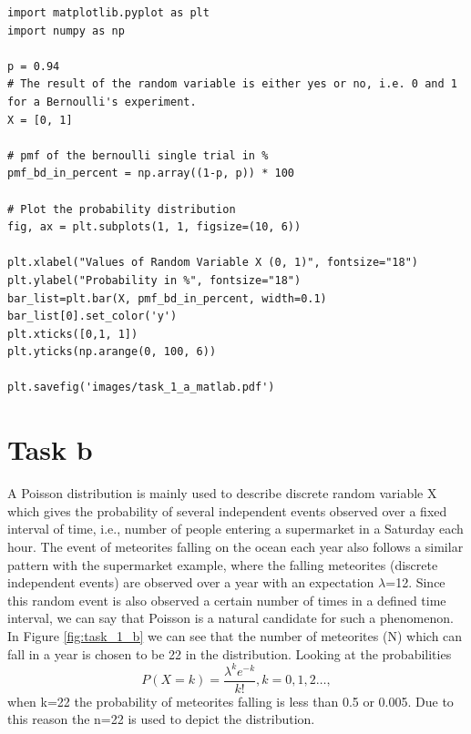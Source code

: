 \begin{lstlisting}[caption={: Plotting the PMF for representing Bernoulli’s single trial P (votes=for & votes = against)},label=code_task_1_a]
import matplotlib.pyplot as plt
import numpy as np

p = 0.94
# The result of the random variable is either yes or no, i.e. 0 and 1 for a Bernoulli's experiment.
X = [0, 1]

# pmf of the bernoulli single trial in %
pmf_bd_in_percent = np.array((1-p, p)) * 100

# Plot the probability distribution
fig, ax = plt.subplots(1, 1, figsize=(10, 6))

plt.xlabel("Values of Random Variable X (0, 1)", fontsize="18")
plt.ylabel("Probability in %", fontsize="18")
bar_list=plt.bar(X, pmf_bd_in_percent, width=0.1)
bar_list[0].set_color('y')
plt.xticks([0,1, 1])
plt.yticks(np.arange(0, 100, 6))

plt.savefig('images/task_1_a_matlab.pdf')
\end{lstlisting}

\section{Task b}

A Poisson distribution is mainly used to describe discrete random variable X which gives the probability of several independent events observed over a fixed interval of time, i.e., number of people entering a supermarket in a Saturday each hour. \newline
The event of meteorites falling on the ocean each year also follows a similar pattern with the supermarket example, where the falling meteorites (discrete independent events) are observed over a year with an expectation ${\lambda}$=12. Since this random event is also observed a certain number of times in a defined time interval, we can say that Poisson is a natural candidate for such a phenomenon.\newline\newline
In Figure \ref{fig:task_1_b} we can see that the number of meteorites (N) which can fall in a year is chosen to be 22 in the distribution. Looking at the probabilities  \begin{equation} P(X=k)=\frac{\lambda^k e^{-k}}{k!}, k=0,1,2…,  \label{pmf_poission}\end{equation} when k=22 the probability of meteorites falling is less than 0.5 or 0.005. Due to this reason the n=22 is used to depict the distribution. 

